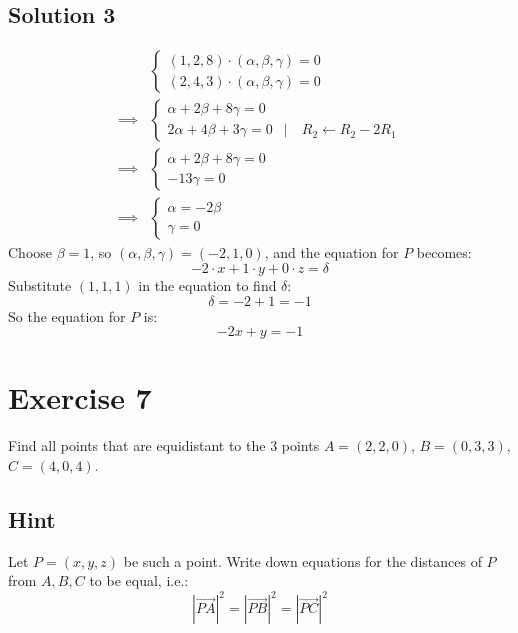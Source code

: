 \documentclass[a4paper,10pt]{article}
\begin{document}
\subsection{Solution 3}
\begin{align*}
             & \begin{cases}
                   (1, 2, 8) \cdot (\alpha, \beta, \gamma) = 0 \\
                   (2, 4, 3) \cdot (\alpha, \beta, \gamma) = 0
               \end{cases}                         \\
    \implies & \begin{cases}
                   \alpha + 2\beta +8\gamma = 0                                        \\
                   2\alpha + 4\beta + 3\gamma = 0 & | \quad R_2 \leftarrow R_2 - 2 R_1
               \end{cases} \\
    \implies & \begin{cases}
                   \alpha + 2\beta +8\gamma = 0 \\
                   -13\gamma = 0
               \end{cases}
    \\ \implies & \begin{cases}
        \alpha = -2\beta \\
        \gamma = 0
    \end{cases}
\end{align*}
Choose $\beta = 1$, so $(\alpha, \beta, \gamma) = (-2, 1, 0)$, and the equation for $P$ becomes:
\[
    -2\cdot x + 1\cdot y + 0\cdot z = \delta
\]
Substitute $(1, 1, 1)$ in the equation to find $\delta$:
\[
    \delta = -2 + 1 = -1
\]
So the equation for $P$ is:
\[
    -2x+y=-1
\]

\clearpage

\section{Exercise 7}

Find all points that are equidistant to the 3 points $A = (2, 2, 0)$, $B = (0, 3, 3)$, $C = (4, 0, 4)$.

\subsection{Hint}
Let $P=(x,y,z)$ be such a point. Write down equations for the distances of $P$ from $A,B,C$ to be equal, i.e.:
\[
    \left|\overrightarrow{PA}\right|^2 = \left|\overrightarrow{PB}\right|^2 = \left|\overrightarrow{PC}\right|^2
\]
\end{document}
